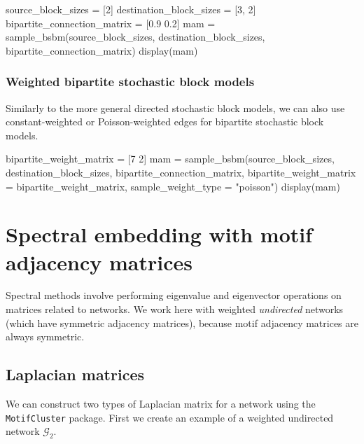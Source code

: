 \documentclass{article}
\begin{document}
\begin{tcolorbox}[colback=black!5!white,colframe=black!15!white]
\begin{juliablock}
source_block_sizes = [2]
destination_block_sizes = [3, 2]
bipartite_connection_matrix = [0.9 0.2]
mam = sample_bsbm(source_block_sizes, destination_block_sizes,
                  bipartite_connection_matrix)
display(mam)
\end{juliablock}
\texttt{\obeylines\printpythontex}
\end{tcolorbox}

\subsubsection{Weighted bipartite stochastic block models}

Similarly to the more general directed stochastic block models,
we can also use constant-weighted or Poisson-weighted edges for bipartite
stochastic block models.

\begin{tcolorbox}[colback=black!5!white,colframe=black!15!white]
\begin{juliablock}
bipartite_weight_matrix = [7 2]
mam = sample_bsbm(source_block_sizes, destination_block_sizes,
                  bipartite_connection_matrix,
                  bipartite_weight_matrix = bipartite_weight_matrix,
                  sample_weight_type = "poisson")
display(mam)
\end{juliablock}
\texttt{\obeylines\printpythontex}
\end{tcolorbox}




\section{Spectral embedding with motif adjacency matrices}

Spectral methods involve performing eigenvalue and
eigenvector operations on matrices related to networks.
We work here with weighted \emph{undirected} networks
(which have symmetric adjacency matrices),
because motif adjacency matrices are always symmetric.

\subsection{Laplacian matrices}

We can construct two types of Laplacian matrix for a network
using the \texttt{MotifCluster} package.
First we create an example of a weighted undirected network $\mathcal{G}_2$.
\end{document}
